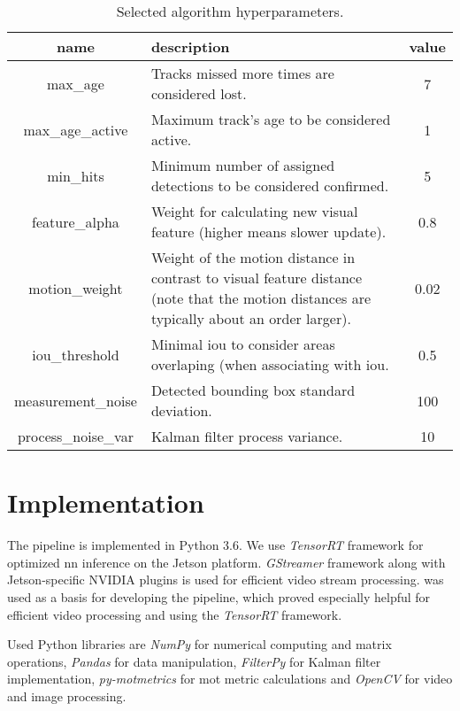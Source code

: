 \begin{table}[htb]
    \centering
    
    \begin{tabularx}{\textwidth}{c|X|c}
        name & description & value \\
        \hline
        max\_age & Tracks missed more times are considered lost. & 7  \\
        max\_age\_active & Maximum track's age to be considered active. & 1 \\
        min\_hits & Minimum number of assigned detections to be considered confirmed. & 5 \\
        feature\_alpha & Weight for calculating new visual feature (higher means slower update). & 0.8 \\
        motion\_weight & Weight of the motion distance in contrast to visual feature distance (note that the motion distances are typically about an order larger). & 0.02 \\
        iou\_threshold & Minimal \gls{iou} to consider areas overlaping (when associating with \gls{iou}. & 0.5 \\
        measurement\_noise & Detected bounding box standard deviation. & 100 \\
        process\_noise\_var & Kalman filter process variance. & 10
    \end{tabularx}
    
    \caption{Selected algorithm hyperparameters.}
    \label{table:hyperparameters}
\end{table}

\section{Implementation}

The pipeline is implemented in Python 3.6. We use \textit{TensorRT} framework for optimized \gls{nn} inference on the Jetson platform. \textit{GStreamer} framework along with Jetson-specific NVIDIA plugins is used for efficient video stream processing. \cite{yukai_yang_2020_4294717_fastmot} was used as a basis for developing the pipeline, which proved especially helpful for efficient video processing and using the \textit{TensorRT} framework.

Used Python libraries are \textit{NumPy} for numerical computing and matrix operations, \textit{Pandas} for data manipulation, \textit{FilterPy} for Kalman filter implementation, \textit{py-motmetrics} for \gls{mot} metric calculations and \textit{OpenCV} for video and image processing.

